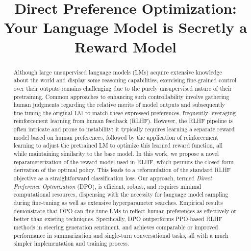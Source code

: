 \title{Direct Preference Optimization: Your Language Model is Secretly a Reward Model}

\begin{abstract}
Although large unsupervised language models (LMs) acquire extensive knowledge about the world and display some reasoning capabilities, exercising fine-grained control over their outputs remains challenging due to the purely unsupervised nature of their pretraining. Common approaches to enhancing such controllability involve gathering human judgments regarding the relative merits of model outputs and subsequently fine-tuning the original LM to match these expressed preferences, frequently leveraging reinforcement learning from human feedback (RLHF). However, the RLHF pipeline is often intricate and prone to instability: it typically requires learning a separate reward model based on human preferences, followed by the application of reinforcement learning to adjust the pretrained LM to optimize this learned reward function, all while maintaining similarity to the base model. In this work, we propose a novel reparameterization of the reward model used in RLHF, which permits the closed-form derivation of the optimal policy. This leads to a reformulation of the standard RLHF objective as a straightforward classification loss. Our approach, termed \textit{Direct Preference Optimization} (DPO), is efficient, robust, and requires minimal computational resources, dispensing with the necessity for language model sampling during fine-tuning as well as extensive hyperparameter searches. Empirical results demonstrate that DPO can fine-tune LMs to reflect human preferences as effectively or better than existing techniques. Specifically, DPO outperforms PPO-based RLHF methods in steering generation sentiment, and achieves comparable or improved performance in summarization and single-turn conversational tasks, all with a much simpler implementation and training process.
\end{abstract}

